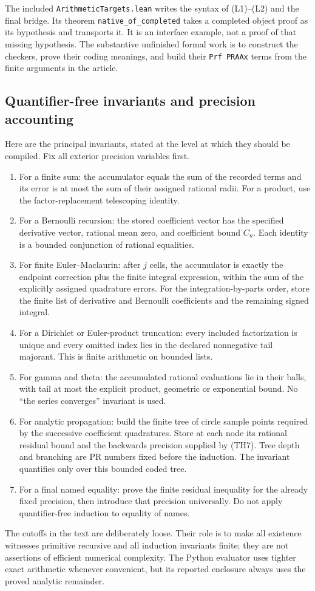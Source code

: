 The included \texttt{ArithmeticTargets.lean} writes the syntax of
(L1)--(L2) and the final bridge. Its theorem
\texttt{native\_of\_completed} takes a completed object proof as its
hypothesis and transports it. It is an interface example, not a proof of
that missing hypothesis. The substantive unfinished formal work is to
construct the checkers, prove their coding meanings, and build their
\texttt{Prf PRAAx} terms from the finite arguments in the article.

\subsection{Quantifier-free invariants and precision accounting}
Here are the principal invariants, stated at the level at which they
should be compiled. Fix all exterior precision variables first.
\begin{enumerate}[leftmargin=*,itemsep=4pt]
\item For a finite sum: the accumulator equals the sum of the recorded
terms and its error is at most the sum of their assigned rational
radii. For a product, use the factor-replacement telescoping identity.
\item For a Bernoulli recursion: the stored coefficient vector has the
specified derivative vector, rational mean zero, and coefficient bound
$C_n$. Each identity is a bounded conjunction of rational equalities.
\item For finite Euler--Maclaurin: after $j$ cells, the accumulator is
exactly the endpoint correction plus the finite integral expression,
within the sum of the explicitly assigned quadrature errors. For the
integration-by-parts order, store the finite list of derivative and
Bernoulli coefficients and the remaining signed integral.
\item For a Dirichlet or Euler-product truncation: every included
factorization is unique and every omitted index lies in the declared
nonnegative tail majorant. This is finite arithmetic on bounded lists.
\item For gamma and theta: the accumulated rational evaluations lie
in their balls, with tail at most the explicit product, geometric or
exponential bound. No ``the series converges'' invariant is used.
\item For analytic propagation: build the finite tree of circle sample
points required by the successive coefficient quadratures. Store at each
node its rational residual bound and the backwards precision supplied
by (TH7). Tree depth and branching are PR numbers fixed before the
induction. The invariant quantifies only over this bounded coded tree.
\item For a final named equality: prove the finite residual inequality
for the already fixed precision, then introduce that precision
universally. Do not apply quantifier-free induction to equality of names.
\end{enumerate}
The cutoffs in the text are deliberately loose. Their role is to make
all existence witnesses primitive recursive and all induction invariants
finite; they are not assertions of efficient numerical complexity.
The Python evaluator uses tighter exact arithmetic whenever convenient,
but its reported enclosure always uses the proved analytic remainder.

